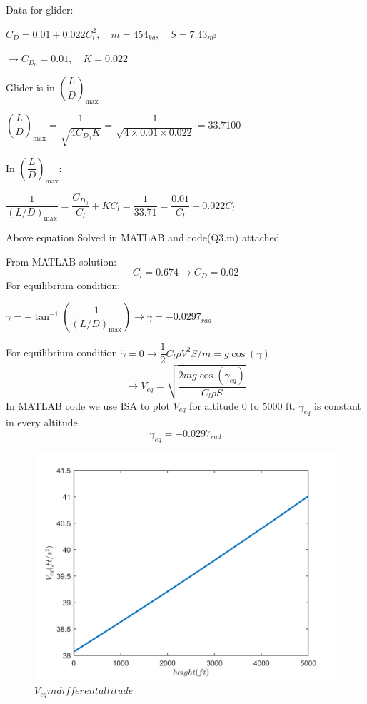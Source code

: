 Data for glider:


$C_D = 0.01 + 0.022C_l^2, \quad m = 454_{kg}, \quad S = 7.43_{m^2}$


$\to C_{D_0} = 0.01, \quad K = 0.022$


Glider is in $(\dfrac{L}{D})_{\max}$

$(\dfrac{L}{D})_{\max} = \dfrac{1}{\sqrt{4C_{D_0}K}} = \dfrac{1}{\sqrt{4\times 0.01 \times 0.022}} = 33.7100$


In $(\dfrac{L}{D})_{\max}$:


$\dfrac{1}{(L/D)_{\max}} = \dfrac{C_{D_0}}{C_l} + K C_l = \dfrac{1}{33.71} = \dfrac{0.01}{C_l} + 0.022 C_l $ 


Above equation Solved in MATLAB and code(Q3.m) attached.


From MATLAB solution:
$$C_l = 0.674\to C_D = 0.02$$ 
For equilibrium condition:


$\gamma = -\tan^{-1}(\dfrac{1}{(L/D)_{\max}}) \to \gamma = -0.0297_{rad}$


For equilibrium condition $\dot{\gamma} = 0 
\to \dfrac12 C_l  \rho V^2S/m = g\cos(\gamma)$
$$\to V_{eq} = \sqrt{\dfrac{2mg\cos(\gamma_{eq})}{C_l \rho S}}$$
In MATLAB code we use ISA to plot $V_{eq}$ for altitude 0 to 5000 ft.
$\gamma_{eq}$ is constant in every altitude.
$$\gamma_{eq} = -0.0297_{rad}$$
\begin{figure}[H]
	\caption{$V_{eq} in different altitude$}
	\centering
	\includegraphics[width=12cm]{Q3/figures/V_eq.png}
\end{figure}
